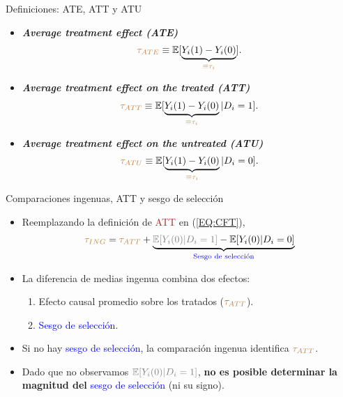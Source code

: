 \documentclass[10pt, xcolor=dvipsnames]{beamer}
\begin{document}
\begin{frame}{Definiciones: ATE, ATT y ATU}	
	\begin{itemize}
		\item \textbf{\textit{Average treatment effect (ATE)}}
		\begin{align}
			\begin{split}
				\textcolor{brown}{\tau_{ATE}} \equiv \operatorname{\mathbb{E}}[\underbrace{Y_i(1) - Y_i(0)}_{\textcolor{brown}{\equiv \tau_i}}].
			\end{split}
		\end{align}	
		\pause
		\item \textbf{\textit{Average treatment effect on the treated (ATT)}}
		\begin{align}
			\begin{split}
				\textcolor{brown}{\tau_{ATT}} \equiv \operatorname{\mathbb{E}}[\underbrace{Y_i(1) - Y_i(0)}_{\textcolor{brown}{\equiv \tau_i}}|D_i=1].
			\end{split}
		\end{align}		
		\pause
		\item \textbf{\textit{Average treatment effect on the untreated (ATU)}}
		\begin{align}
			\begin{split}
				\textcolor{brown}{\tau_{ATU}} \equiv \operatorname{\mathbb{E}}[\underbrace{Y_i(1) - Y_i(0)}_{\textcolor{brown}{\equiv \tau_i}}|D_i=0].
			\end{split}
		\end{align}	 	
	\end{itemize}
\end{frame}


\begin{frame}{Comparaciones ingenuas, ATT y sesgo de selección}
\begin{itemize}
    \item Reemplazando la definición de \textcolor{brown}{ATT} en (\ref{EQ:CFT}),
    \begin{align}
        \textcolor{brown}{\tau_{ING}} = \textcolor{brown}{\tau_{ATT}} + \underbrace{\textcolor{gray}{\EX[Y_i(0)|D_i =1]} - \EX[Y_i(0)|D_i =0]}_{\textcolor{blue}{\text{Sesgo de selección}}}
    \end{align}
    \item La diferencia de medias ingenua combina dos efectos:
    \begin{enumerate}
	\item Efecto causal promedio sobre los tratados ($\textcolor{brown}{\tau_{ATT}}$).
	\item \textcolor{blue}{Sesgo de selección}.
    \end{enumerate}
        \vspace{0.2cm}
        \item Si no hay \textcolor{blue}{sesgo de selección}, la comparación ingenua identifica $\textcolor{brown}{\tau_{ATT}}$.%
         \vspace{0.2cm}
        \item Dado que no observamos $\textcolor{gray}{\EX[Y_i(0)|D_i =1]}$, \textbf{no es posible determinar la magnitud del} \textcolor{blue}{sesgo de selección} (ni su signo).
    \end{itemize}
\end{frame}
\end{document}
